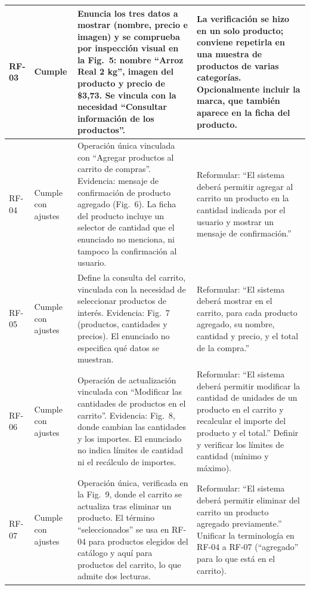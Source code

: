 \documentclass[12pt,a4paper]{article}
\begin{document}
\begin{longtable}{|L{0.075\textwidth}|L{0.11\textwidth}|L{0.40\textwidth}|L{0.31\textwidth}|}
RF-03 & Cumple &
Enuncia los tres datos a mostrar (nombre, precio e imagen) y se
comprueba por inspección visual en la Fig.~5: nombre
``Arroz Real 2 kg'', imagen del producto y precio de \$3,73.
Se vincula con la necesidad ``Consultar información de los
productos''. &
La verificación se hizo en un solo producto; conviene repetirla
en una muestra de productos de varias categorías. Opcionalmente
incluir la marca, que también aparece en la ficha del producto. \\
\hline

RF-04 & Cumple con ajustes &
Operación única vinculada con ``Agregar productos al carrito de
compras''. Evidencia: mensaje de confirmación de producto agregado
(Fig.~6). La ficha del producto incluye un selector de
cantidad que el enunciado no menciona, ni tampoco la confirmación
al usuario. &
Reformular: ``El sistema deberá permitir agregar al carrito un
producto en la cantidad indicada por el usuario y mostrar un
mensaje de confirmación.'' \\
\hline

RF-05 & Cumple con ajustes &
Define la consulta del carrito, vinculada con la necesidad de
seleccionar productos de interés. Evidencia: Fig.~7
(productos, cantidades y precios). El enunciado no especifica qué
datos se muestran. &
Reformular: ``El sistema deberá mostrar en el carrito, para cada
producto agregado, su nombre, cantidad y precio, y el total de la
compra.'' \\
\hline

RF-06 & Cumple con ajustes &
Operación de actualización vinculada con ``Modificar las
cantidades de productos en el carrito''. Evidencia:
Fig.~8, donde cambian las cantidades y los importes.
El enunciado no indica límites de cantidad ni el recálculo de
importes. &
Reformular: ``El sistema deberá permitir modificar la cantidad
de unidades de un producto en el carrito y recalcular el importe
del producto y el total.'' Definir y verificar los límites de
cantidad (mínimo y máximo). \\
\hline

RF-07 & Cumple con ajustes &
Operación única, verificada en la Fig.~9, donde el
carrito se actualiza tras eliminar un producto. El término
``seleccionados'' se usa en RF-04 para productos elegidos del
catálogo y aquí para productos del carrito, lo que admite dos
lecturas. &
Reformular: ``El sistema deberá permitir eliminar del carrito un
producto agregado previamente.'' Unificar la terminología en
RF-04 a RF-07 (``agregado'' para lo que está en el carrito). \\
\hline


\end{longtable}
\end{document}
